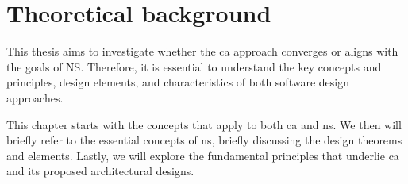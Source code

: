 \chapter{Theoretical background} \label{chap_theoreticalbackground} 

This thesis aims to investigate whether the \gls{ca} approach converges or aligns with the goals
of NS. Therefore, it is essential to understand the key concepts and principles, design
elements, and characteristics of both software design approaches. 

This chapter starts with the concepts that apply to both \gls{ca} and \gls{ns}. We then
will briefly refer to the essential concepts of \gls{ns}, briefly discussing the design
theorems and elements. Lastly, we will explore the fundamental principles that
underlie \gls{ca} and its proposed architectural designs.




